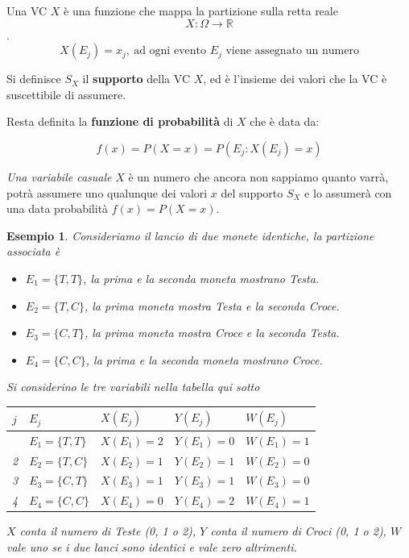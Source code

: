 \documentclass[
  11pt,
]{book}
\providecommand{\tightlist}{%
  \setlength{\itemsep}{0pt}\setlength{\parskip}{0pt}}
\theoremstyle{mytheoremstyle}
\theoremstyle{mydefstyle}
\newtheorem{example}{{Esempio}}[section]
\begin{document}
Una VC \(X\) è una funzione che mappa la partizione sulla retta reale \[X:\Omega\to\mathbb{R}\]. \[X(E_j)=x_j,~\text{ad ogni evento $E_j$ viene assegnato un numero}\]

Si definisce \(S_X\) il \textbf{supporto} della VC \(X\), ed è l'insieme dei valori che la VC è suscettibile di assumere.

Resta definita la \textbf{funzione di probabilità} di \(X\) che è data da:

\[
f(x)=P(X=x)=P(E_j:X(E_j)=x)
\]

\emph{Una variabile casuale} \(X\) è un numero che ancora non sappiamo quanto varrà, potrà assumere uno qualunque dei valori \(x\) del supporto \(S_X\) e lo assumerà con una data probabilità \(f(x)=P(X=x)\).

\begin{example}
Consideriamo il lancio di due monete identiche, la partizione associata è

\begin{itemize}
\tightlist
\item
  \(E_1=\{T,T\}\), la prima e la seconda moneta mostrano Testa.
\item
  \(E_2=\{T,C\}\), la prima moneta mostra Testa e la seconda Croce.
\item
  \(E_3=\{C,T\}\), la prima moneta mostra Croce e la seconda Testa.
\item
  \(E_4=\{C,C\}\), la prima e la seconda moneta mostrano Croce.
\end{itemize}

Si considerino le tre variabili nella tabella qui sotto

\begin{longtable}[]{@{}lllll@{}}
\toprule\noalign{}
\(j\) & \(E_j\) & \(X(E_j)\) & \(Y(E_j)\) & \(W(E_j)\) \\
\midrule\noalign{}
\endhead
\bottomrule\noalign{}
\endlastfoot
1 & \(E_1=\{T,T\}\) & \(X(E_1)=2\) & \(Y(E_1)=0\) & \(W(E_1)=1\) \\
2 & \(E_2=\{T,C\}\) & \(X(E_2)=1\) & \(Y(E_2)=1\) & \(W(E_2)=0\) \\
3 & \(E_3=\{C,T\}\) & \(X(E_3)=1\) & \(Y(E_3)=1\) & \(W(E_3)=0\) \\
4 & \(E_4=\{C,C\}\) & \(X(E_4)=0\) & \(Y(E_4)=2\) & \(W(E_4)=1\) \\
\end{longtable}

\(X\) conta il numero di Teste (0, 1 o 2), \(Y\) conta il numero di Croci (0, 1 o 2),
\(W\) vale uno se i due lanci sono identici e vale zero altrimenti.


\end{example}
\end{document}
